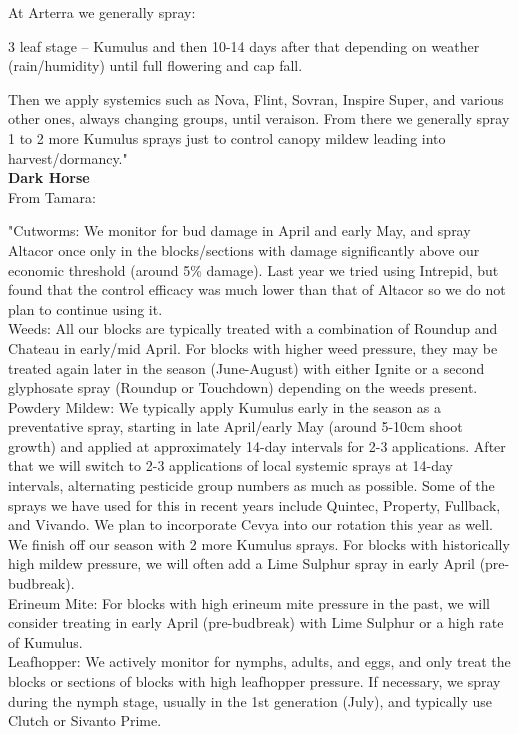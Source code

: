 \documentclass[11pt,letter]{article}
\begin{document}
At Arterra we generally spray:

3 leaf stage – Kumulus and then 10-14 days after that depending on weather (rain/humidity) until full flowering and cap fall.

Then we apply systemics such as Nova, Flint, Sovran, Inspire Super, and various other ones, always changing groups, until veraison. From there we generally spray 1 to 2 more Kumulus sprays just to control canopy mildew leading into harvest/dormancy." \\

{\bf Dark Horse} \\
From Tamara:

"Cutworms: We monitor for bud damage in April and early May, and spray Altacor once only in the blocks/sections with damage significantly above our economic threshold (around 5\% damage). Last year we tried using Intrepid, but found that the control efficacy was much lower than that of Altacor so we do not plan to continue using it. \\

Weeds: All our blocks are typically treated with a combination of Roundup and Chateau in early/mid April. For blocks with higher weed pressure, they may be treated again later in the season (June-August) with either Ignite or a second glyphosate spray (Roundup or Touchdown) depending on the weeds present. \\

Powdery Mildew: We typically apply Kumulus early in the season as a preventative spray, starting in late April/early May (around 5-10cm shoot growth) and applied at approximately 14-day intervals for 2-3 applications. After that we will switch to 2-3 applications of local systemic sprays at 14-day intervals, alternating pesticide group numbers as much as possible. Some of the sprays we have used for this in recent years include Quintec, Property, Fullback, and Vivando. We plan to incorporate Cevya into our rotation this year as well. We finish off our season with 2 more Kumulus sprays. For blocks with historically high mildew pressure, we will often add a Lime Sulphur spray in early April (pre-budbreak). \\

Erineum Mite: For blocks with high erineum mite pressure in the past, we will consider treating in early April (pre-budbreak) with Lime Sulphur or a high rate of Kumulus. \\

Leafhopper: We actively monitor for nymphs, adults, and eggs, and only treat the blocks or sections of blocks with high leafhopper pressure. If necessary, we spray during the nymph stage, usually in the 1st generation (July), and typically use Clutch or Sivanto Prime. \\
\end{document}
